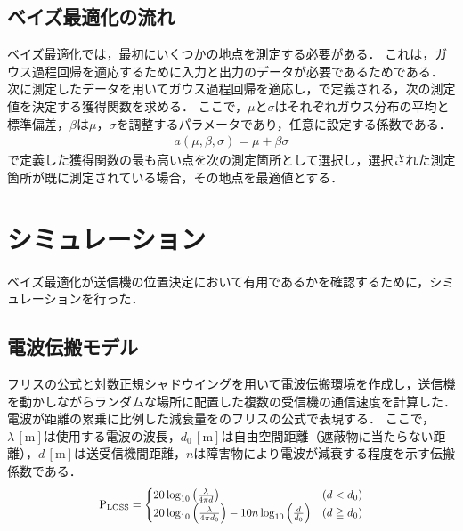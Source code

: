 \documentclass[twocolumn]{ltjarticle}
\begin{document}
\subsection{ベイズ最適化の流れ}

ベイズ最適化では，最初にいくつかの地点を測定する必要がある．
これは，ガウス過程回帰を適応するために入力と出力のデータが必要であるためである．
次に測定したデータを用いてガウス過程回帰を適応し，で定義される，次の測定値を決定する獲得関数を求める．
ここで，\(\mu\)と\(\sigma\)はそれぞれガウス分布の平均と標準偏差，\(\beta\)は\(\mu\)，\(\sigma\)を調整するパラメータであり，任意に設定する係数である．
\begin{align}
	a(\mu, \beta, \sigma) = \mu + \beta \sigma \label{eq:acquisition}
\end{align}
で定義した獲得関数の最も高い点を次の測定箇所として選択し，選択された測定箇所が既に測定されている場合，その地点を最適値とする．
\section{シミュレーション}

ベイズ最適化が送信機の位置決定において有用であるかを確認するために，シミュレーションを行った．
\subsection{電波伝搬モデル}

フリスの公式と対数正規シャドウイングを用いて電波伝搬環境を作成し，送信機を動かしながらランダムな場所に配置した複数の受信機の通信速度を計算した．
電波が距離の累乗に比例した減衰量をのフリスの公式で表現する．
ここで，\(\lambda\,\mathrm{[m]}\)は使用する電波の波長，\(d_0\,\mathrm{[m]}\)は自由空間距離（遮蔽物に当たらない距離），\(d\,\mathrm{[m]}\)は送受信機間距離，\(n\)は障害物により電波が減衰する程度を示す伝搬係数である．
\begin{align}
	\scalebox{0.9}{
		\(
		\mathrm{P_{LOSS}} =
		\begin{cases}
			20 \log_{10} \left( \frac{\lambda}{4 \pi d} \right)                                                & (d < d_0)     \\
			20 \log_{10} \left( \frac{\lambda}{4 \pi d_0} \right) - 10n \log_{10} \left( \frac{d}{d_0} \right) & (d \geqq d_0)
		\end{cases} \label{eq:friss}
		\)
	}
\end{align}
\end{document}
